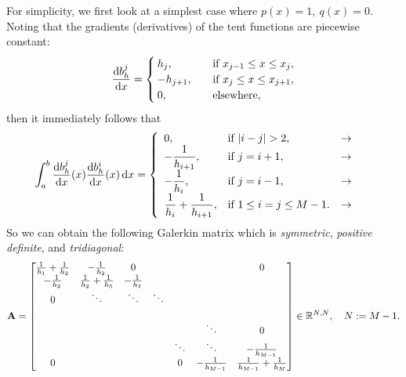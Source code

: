 	For simplicity, we first look at a simplest case where $p(x)=1,\ q(x)=0$.
	Noting that the gradients (derivatives) of the tent functions are 
	piecewise constant:
	\begin{equation}\label{eq:1D tent function derivatives}
	\frac{\mathrm{d} b_h^j}{\mathrm{d} x}=\begin{cases}
	h_{j},   \quad &\textrm{if}\ x_{j-1}\leq x\leq x_{j},\\
	-h_{j+1},\quad &\textrm{if}\ x_{j}\leq x\leq x_{j+1},\\
	0,	  	 \quad &\textrm{elsewhere},
	\end{cases}
	\end{equation}
	then it immediately follows that
	\begin{equation*}
	\int_{a}^{b}\frac{\rd b_h^j}{\rd x}(x)\frac{\rd b_h^i}{\rd x}(x)\,\rd x=
	\left\{
	\begin{array}{lll}
		0, &\textrm{if}\ |i-j|>2,  &\rightarrow \quad 
		\vcenter{\hbox{}}\\
		
		-\dfrac{1}{h_{i+1}}, &\textrm{if}\ j=i+1, &\rightarrow \quad 
		\vcenter{\hbox{}}\\
		
		-\dfrac{1}{h_{i}}, &\textrm{if}\ j=i-1, &\rightarrow \quad 
		\vcenter{\hbox{}}\\
		
		\dfrac{1}{h_{i}}+\dfrac{1}{h_{i+1}},&\textrm{if}\ 1\leq i=j\leq M-1.
		&\rightarrow \quad \vcenter{\hbox{}}
	\end{array}\right.
	\end{equation*}	
	So we can obtain the following Galerkin matrix which is \emph{symmetric},
	\emph{positive definite}, and \emph{tridiagonal}:
	\begin{equation}\label{eq:1D simplest Galerkin matrix}
	\mathbf{A} = \begin{bmatrix} 
	\frac{1}{h_1}+\frac{1}{h_2} & -\frac{1}{h_2} & 0 & & & &0\\
	-\frac{1}{h_2} & \frac{1}{h_2}+\frac{1}{h_3} &-\frac{1}{h_3} & & & &\\
	0 &\ddots &\ddots &\ddots & & & \\
	& & & & & & \\
	& & & & &\ddots &0 \\
	& & & &\ddots &\ddots &-\frac{1}{h_{M-1}} \\
	0 & & & &0 &-\frac{1}{h_{M-1}} &\frac{1}{h_{M-1}}+\frac{1}{h_{M}}
	\end{bmatrix}\in\mathbb{R}^{N,N},\quad N:=M-1.
	\end{equation}
